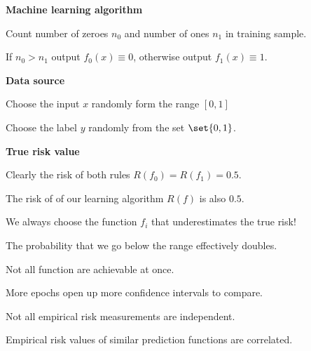 \documentclass[landscape,footrule]{foils}
\begin{document}

\textbf{Machine learning algorithm}
\begin{triangles}
\item Count number of zeroes $n_0$ and number of ones $n_1$ in training sample.
\item If $n_0>n_1$ output $f_0(x)\equiv 0$, otherwise output $f_1(x)\equiv 1$.
\end{triangles}
\vspace*{1cm}

\textbf{Data source}
\begin{triangles}
\item Choose the input $x$ randomly form the range $[0,1]$
\item Choose the label $y$ randomly from the set $\set{0,1}$.
\end{triangles}

\vspace*{1cm}
\textbf{True risk value}
\begin{triangles}
\item Clearly the risk of both rules $R(f_0)=R(f_1)=0.5$.
\item The risk of of our learning algorithm $R(f)$ is also $0.5$. 
\end{triangles}



\begin{triangles}
\item We always choose the function $f_i$ that underestimates the true risk!
\item The probability that we go below the range effectively doubles. 
\end{triangles}




\vspace*{1cm}

\begin{triangles}
\item Not all function are achievable at once. 
\item More epochs open up more confidence intervals to compare.
\item Not all empirical risk measurements are independent.
\item Empirical risk values of similar prediction functions are correlated.
\end{triangles}
\end{document}
